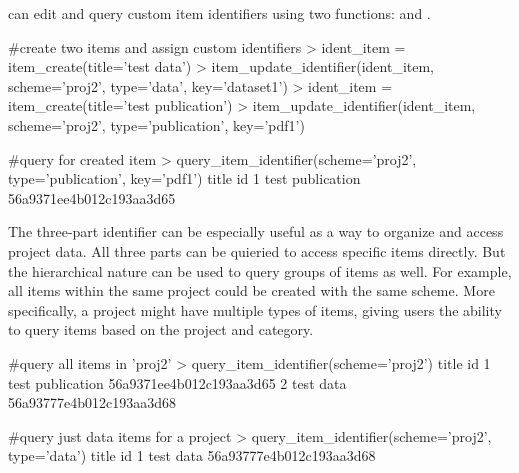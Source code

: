  can edit and query custom item identifiers using two functions:
 and . 

\begin{example}
#create two items and assign custom identifiers
> ident_item = item_create(title='test data')
> item_update_identifier(ident_item, scheme='proj2', type='data', key='dataset1')
> ident_item = item_create(title='test publication')
> item_update_identifier(ident_item, scheme='proj2', type='publication', key='pdf1')

#query for created item
> query_item_identifier(scheme='proj2', type='publication', key='pdf1')
             title                       id
1 test publication 56a9371ee4b012c193aa3d65

\end{example}

The three-part identifier can be especially useful as a way to organize and 
access project data. All three parts can be quieried to access specific items 
directly. But the hierarchical nature can be used to query groups of items as well. 
For example, all items within the same project could be created with the same 
scheme. More specifically, a project might have multiple types of items, giving
users the ability to query items based on the project and category.

\begin{example}
#query all items in 'proj2'
> query_item_identifier(scheme='proj2')
             title                       id
1 test publication 56a9371ee4b012c193aa3d65
2        test data 56a93777e4b012c193aa3d68

#query just data items for a project
> query_item_identifier(scheme='proj2', type='data')
      title                       id
1 test data 56a93777e4b012c193aa3d68

\end{example}


